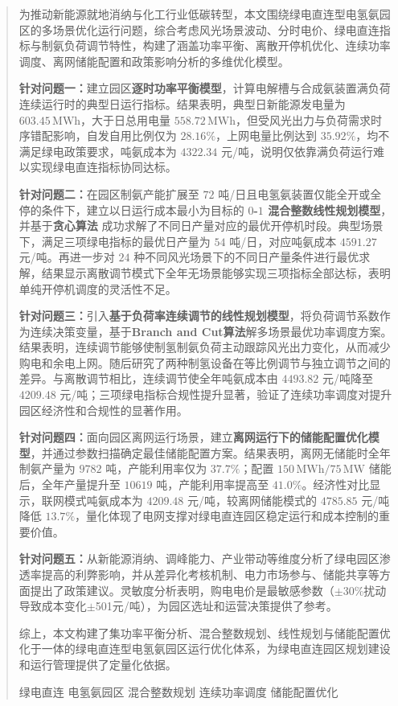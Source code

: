 \documentclass[a4paper]{neepumcm}
\begin{document}
\begin{abstract}

为推动新能源就地消纳与化工行业低碳转型，本文围绕绿电直连型电氢氨园区的多场景优化运行问题，综合考虑风光场景波动、分时电价、绿电直连指标与制氨负荷调节特性，构建了涵盖功率平衡、离散开停机优化、连续功率调度、离网储能配置和政策影响分析的多维优化模型。

\textbf{针对问题一：}建立园区\textbf{逐时功率平衡模型}，计算电解槽与合成氨装置满负荷连续运行时的典型日运行指标。结果表明，典型日新能源发电量为 $603.45\,\mathrm{MWh}$，大于日总用电量 $558.72\,\mathrm{MWh}$，但受风光出力与负荷需求时序错配影响，自发自用比例仅为 $28.16\%$，上网电量比例达到 $35.92\%$，均不满足绿电政策要求，吨氨成本为 $4322.34$ 元/吨，说明仅依靠满负荷运行难以实现绿电直连指标协同达标。

\textbf{针对问题二：}在园区制氨产能扩展至 $72$ 吨/日且电氢氨装置仅能全开或全停的条件下，建立以日运行成本最小为目标的 \textbf{$0$-$1$ 混合整数线性规划模型}，并基于\textbf{贪心算法} 成功求解了不同日产量对应的最优开停机时段。典型场景下，满足三项绿电指标的最优日产量为 $54$ 吨/日，对应吨氨成本 $4591.27$ 元/吨。再进一步对 $24$ 种不同风光场景下的不同日产量条件进行最优求解，结果显示离散调节模式下全年无场景能够实现三项指标全部达标，表明单纯开停机调度的灵活性不足。

\textbf{针对问题三：}引入\textbf{基于负荷率连续调节的线性规划模型}，将负荷调节系数作为连续决策变量，基于\textbf{Branch and Cut算法}解多场景最优功率调度方案。结果表明，连续调节能够使制氢制氨负荷主动跟踪风光出力变化，从而减少购电和余电上网。随后研究了两种制氢设备在等比例调节与独立调节之间的差异。与离散调节相比，连续调节使全年吨氨成本由 $4493.82$ 元/吨降至 $4209.48$ 元/吨；三项绿电指标合规性提升显著，验证了连续功率调度对提升园区经济性和合规性的显著作用。

\textbf{针对问题四：}面向园区离网运行场景，建立\textbf{离网运行下的储能配置优化模型}，并通过参数扫描确定最佳储能配置方案。结果表明，离网无储能时全年制氨产量为 $9782$ 吨，产能利用率仅为 $37.7\%$；配置 $150\,\mathrm{MWh}/75\,\mathrm{MW}$ 储能后，全年产量提升至 $10619$ 吨，产能利用率提高至 $41.0\%$。经济性对比显示，联网模式吨氨成本为 $4209.48$ 元/吨，较离网储能模式的 $4785.85$ 元/吨降低 $13.7\%$，量化体现了电网支撑对绿电直连园区稳定运行和成本控制的重要价值。

\textbf{针对问题五：}从新能源消纳、调峰能力、产业带动等维度分析了绿电园区渗透率提高的利弊影响，并从差异化考核机制、电力市场参与、储能共享等方面提出了政策建议。灵敏度分析表明，购电电价是最敏感参数（$\pm$30\%扰动导致成本变化$\pm$501元/吨），为园区选址和运营决策提供了参考。

综上，本文构建了集功率平衡分析、混合整数规划、线性规划与储能配置优化于一体的绿电直连型电氢氨园区运行优化体系，为绿电直连园区规划建设和运行管理提供了定量化依据。

\begin{keywords}
绿电直连 \quad 电氢氨园区 \quad 混合整数规划 \quad 连续功率调度 \quad 储能配置优化
\end{keywords}
\end{abstract}
\end{document}
